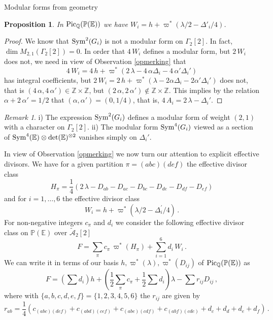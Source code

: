 \documentclass[12pt]{amsart}
\numberwithin{equation}{section}
\newcommand{\EE}{\mathbb E}
\newcommand{\PP}{\mathbb P}
\newcommand{\QQ}{\mathbb Q}
\newcommand{\ZZ}{\mathbb Z}
\numberwithin{equation}{section}
\newtheorem{proposition}[theorem]{Proposition}
\theoremstyle{definition}
\theoremstyle{remark}
\newtheorem{remark}[theorem]{Remark}
\begin{document}
\begin{section}{Modular forms from geometry}
\begin{proposition}\label{Wiclass} In ${\rm Pic}_{\QQ}({\PP}({\EE}))$ we have $W_i= h+\varpi^*( \lambda/2 -\Delta'_i/4)$.
\end{proposition}
\begin{proof} We know that ${\rm Sym}^2(G_i)$ is not a modular form on $\Gamma_2[2]$. 
In fact, $\dim M_{2,1}(\Gamma_2[2])=0$.
In order that $4\, W_i$ defines a modular form, but $2\, W_i$ does not, we need in view of Observation 
\ref{opmerking} that
$$
4\, W_i=4\, h + \varpi^*(2\, \lambda - 4\, \alpha\Delta_i - 4\, \alpha'\Delta_i')
$$
has integral coefficients, but $2\, W_i=2\, h +  \varpi^*(\lambda - 2\alpha\Delta_i - 2\alpha'\Delta_i')$
does not, that is
$(4\, \alpha, 4\, \alpha')\in {\ZZ}\times {\ZZ}$, but $ (2\, \alpha,2\, \alpha') \not\in {\ZZ}\times {\ZZ}$.
This implies by the relation $\alpha+2\, \alpha'=1/2$ that $(\alpha,\alpha')=(0,1/4)$,
that is, $4\, A_i=2\, \lambda - \Delta_i'$.
\end{proof}
\begin{remark} i)
The expression ${\rm Sym}^2(G_i)$ defines a modular form of weight $(2,1)$
with a character on $\Gamma_2[2]$.
ii)  The modular form
${\rm Sym}^4(G_i)$ viewed as a section
of ${\rm Sym}^4({\EE}) \otimes \det({\EE})^{\otimes 2}$ vanishes simply on $\Delta_i'$.
\end{remark}
In view of Observation \ref{opmerking} we now turn our attention to explicit effective
divisors. 
We have for a given partition  ${\pi}=(abc)(def)$ the effective divisor class
$$
H_{\pi}= \frac{1}{4}\left(2\, \lambda- D_{ab}-D_{ac}-D_{bc}-D_{de}-D_{df}-D_{ef}\right)
$$
and for $i=1,\ldots,6$  the effective divisor class
$$
W_i=h+\varpi^*(\lambda/2-\Delta_i^{\prime}/4)\, .
$$
For non-negative integers
 $c_{\pi}$ and $d_i$
we consider the following effective divisor class on ${\PP}({\EE})$ over $\widetilde{\mathcal{A}}_2[2]$
\begin{equation}\label{effective divisorF}
F=\sum_{\pi} c_{\pi} \, \varpi^*(H_{\pi}) + \sum_{i=1}^6 d_i \, W_i\, .
\end{equation}
We can write it in terms of our basis $h,\varpi^*(\lambda), \varpi^*(D_{ij})$ of ${\rm Pic}_{\QQ}({\PP}({\EE}))$ as
\begin{equation}\label{Finbasis}
F=(\sum d_i)h+(\frac{1}{2}\sum_{\pi} c_{\pi}+\frac{1}{2}\sum d_i) \lambda - \sum r_{ij} D_{ij} \, , 
\end{equation}
where with $\{a,b,c,d,e,f\}=\{1,2,3,4,5,6\}$ the $r_{ij}$ are given by
\begin{equation}\label{rijcoeff}
r_{ab}= \frac{1}{4}\left(c_{(abc)(def)}+c_{(abd)(cef)}+c_{(abe)(cdf)}+c_{(abf)(cde)}+d_c+d_d+d_e+d_f   \right)\, .
\end{equation}


\end{section}
\end{document}
